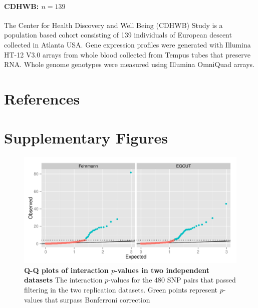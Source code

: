 \documentclass{article}
\begin{document}
\paragraph{CDHWB: $n=139$}
The Center for Health Discovery and Well Being (CDHWB) Study is a population based cohort consisting of 139 individuals of European descent collected in Atlanta USA. Gene expression profiles were generated with Illumina HT-12 V3.0 arrays from whole blood collected from Tempus tubes that preserve RNA. Whole genome genotypes were measured using Illumina OmniQuad arrays.


\clearpage
\section{References}



\clearpage
\section{Supplementary Figures}
\setcounter{figure}{0}
\makeatletter 
\renewcommand{\thefigure}{S\@arabic\c@figure} 
\makeatletter 

\begin{figure}[H]
	\includegraphics[width=5in]{qqbonf}
	\caption{\textbf{Q-Q plots of interaction $p$-values in two independent datasets} The interaction $p$-values for the 480 SNP pairs that passed filtering in the two replication datasets. Green points represent $p$-values that surpass Bonferroni correction}
	\label{fig:qqplotbonf}
\end{figure}
\clearpage
\end{document}
